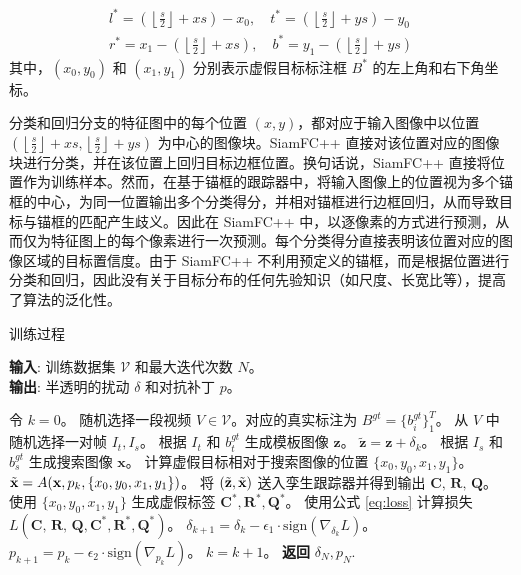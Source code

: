 \begin{equation}
\begin{array}{ll}
l^{*}=\left(\left\lfloor\frac{s}{2}\right\rfloor+x s\right)-x_{0}, \quad t^{*}=\left(\left\lfloor\frac{s}{2}\right\rfloor+y s\right)-y_{0} \\
r^{*}=x_{1}-\left(\left\lfloor\frac{s}{2}\right\rfloor+x s\right), \quad b^{*}=y_{1}-\left(\left\lfloor\frac{s}{2}\right\rfloor+y s\right)
\end{array}
\end{equation}
其中，$(x_0, y_0)$ 和 $(x_1, y_1)$ 分别表示虚假目标标注框 $B^*$ 的左上角和右下角坐标。

分类和回归分支的特征图中的每个位置 $(x,y)$，都对应于输入图像中以位置 $\left(\left\lfloor\frac{s}{2}\right\rfloor+x s,\left\lfloor\frac{s}{2}\right\rfloor+y s\right)$ 为中心的图像块。SiamFC++ \cite{SiamFC++} 直接对该位置对应的图像块进行分类，并在该位置上回归目标边框位置。换句话说，SiamFC++ 直接将位置作为训练样本。然而，在基于锚框的跟踪器中，将输入图像上的位置视为多个锚框的中心，为同一位置输出多个分类得分，并相对锚框进行边框回归，从而导致目标与锚框的匹配产生歧义。因此在 SiamFC++ 中，以逐像素的方式进行预测，从而仅为特征图上的每个像素进行一次预测。每个分类得分直接表明该位置对应的图像区域的目标置信度。由于 SiamFC++ 不利用预定义的锚框，而是根据位置进行分类和回归，因此没有关于目标分布的任何先验知识（如尺度、长宽比等），提高了算法的泛化性。

\begin{algorithm}[tb]
\caption{训练过程}
\label{alg:algorithm}
\textbf{输入}: 训练数据集 $\mathcal{V}$ 和最大迭代次数 $N$。\\
\textbf{输出}: 半透明的扰动 $\delta$ 和对抗补丁 $p$。
\begin{algorithmic}[1] %
\State 令 $k = 0$。
\State 随机选择一段视频 $V\in \mathcal{V}$。对应的真实标注为 $B^{gt}=\{b^{gt}_i\}^T_1$。
\State 从 $V$ 中随机选择一对帧 $I_t, I_s$。
\State 根据 $I_t$ 和 $b^{gt}_t$ 生成模板图像 $\textbf{z}$。
\State $\tilde{\textbf{z}} = \textbf{z} + \delta_k$。
\State 根据 $I_s$ 和 $b^{gt}_s$ 生成搜索图像 $\textbf{x}$。
\State 计算虚假目标相对于搜索图像的位置 $\{x_0, y_0, x_1, y_1\}$。
\State $\tilde{\textbf x} = A(\textbf x, p_k, \{x_0, y_0, x_1, y_1\})$。
\State 将 $(\tilde{\textbf{z}}, \tilde{\textbf x})$ 送入孪生跟踪器并得到输出 $\textbf{C, R, Q}$。
\State 使用 $\{x_0, y_0, x_1, y_1\}$ 生成虚假标签 $\textbf{C}^*,\textbf{R}^*,\textbf{Q}^*$。
\State 使用公式 \ref{eq:loss} 计算损失 $L(\textbf{C, R, Q}, \textbf{C}^*, \textbf{R}^*, \textbf{Q}^*)$。
\State $\delta_{k+1} = \delta_{k} - \epsilon_1 \cdot \text{sign}(\nabla_{\delta_k}L)$。
\State $p_{k+1} = p_{k} - \epsilon_2 \cdot \text{sign}(\nabla_{p_k}L)$。
\State $k = k + 1$。
\EndWhile
\State \textbf{返回} $\delta_N, p_N.$
\end{algorithmic}
\label{attack_alg}
\end{algorithm}

